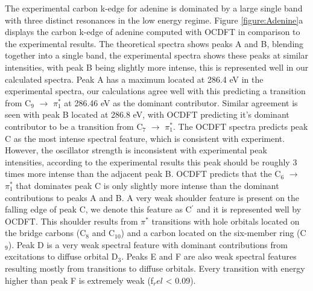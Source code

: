 \documentclass[12pt]{article}
\begin{document}
The experimental carbon k-edge for adenine is dominated by a large single band with three distinct resonances in the low energy regime. Figure \ref{figure:Adenine}a displays the carbon k-edge of adenine computed with OCDFT in comparison to the experimental results. The theoretical spectra shows peaks A and B, blending together into a single band, the experimental spectra shows these peaks at similar intensities, with peak B being slightly more intense, this is represented well in our calculated spectra. Peak A has a maximum located at 286.4 eV in the experimental spectra, our calculations agree well with this predicting a transition from C$_9$ $\rightarrow$ $\pi_1^*$ at 286.46 eV as the dominant contributor. Similar agreement is seen with peak B located at 286.8 eV, with OCDFT predicting it's dominant contributor to be a transition from C$_7$ $\rightarrow$ $\pi_1^*$.  The OCDFT spectra predicts peak C as the most intense spectral feature, which is consistent with experiment. However, the oscillator strength is inconsistent with experimental peak intensities, according to the experimental results this peak should be roughly 3 times more intense than the adjacent peak B. OCDFT predicts that the C$_6$ $\rightarrow$ $\pi^*_1$ that dominates peak C is only slightly more intense than the dominant contributions to peaks A and B. A very weak shoulder feature is present on the falling edge of peak C, we denote this feature as C$^{\prime}$ and it is represented well by OCDFT. This shoulder results from $\pi^*$ transitions with hole orbitals located on the bridge carbons (C$_8$ and C$_{10}$) and a carbon located on the six-member ring (C$_9$). Peak D is a very weak spectral feature with dominant contributions from excitations to diffuse orbital D$_3$. Peaks E and F are also weak spectral features resulting mostly from transitions to diffuse orbitals. Every transition with energy higher than peak F is extremely weak (f$_rel$ < 0.09).
\end{document}
